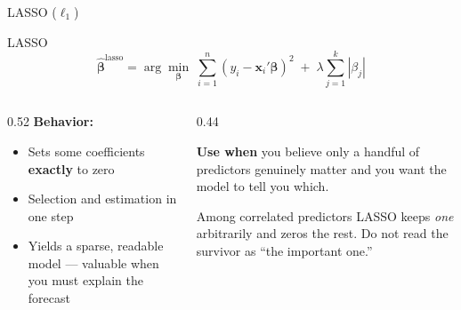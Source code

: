 \documentclass[aspectratio=169, 11pt]{beamer}
\begin{document}
\begin{frame}{LASSO ($\ell_1$)}
  \begin{definitionbox}{LASSO \parencite{Tibshirani1996}}
    \[
      \hat{\boldsymbol{\beta}}^{\text{lasso}}
      = \arg\min_{\boldsymbol{\beta}} \;
        \sum_{i=1}^{n}(y_i - \mathbf{x}_i'\boldsymbol{\beta})^2
        \; + \; \lambda \sum_{j=1}^{k} |\beta_j|
    \]
  \end{definitionbox}
  \begin{columns}[T]
    \begin{column}{0.52\textwidth}
      \textbf{Behavior:}
      \begin{itemize}\small\itemsep0pt
        \item Sets some coefficients \textbf{exactly} to zero
        \item Selection and estimation in one step
        \item Yields a sparse, readable model --- valuable when you
              must explain the forecast
      \end{itemize}
    \end{column}
    \begin{column}{0.44\textwidth}
      \begin{keybox}
        \small \textbf{Use when} you believe only a handful of predictors
        genuinely matter and you want the model to tell you which.
      \end{keybox}
      \vspace{0.1cm}
      \begin{warningbox}
        \footnotesize Among correlated predictors LASSO keeps \emph{one}
        arbitrarily and zeros the rest. Do not read the survivor as
        ``the important one.''
      \end{warningbox}
    \end{column}
  \end{columns}
\end{frame}
\end{document}
